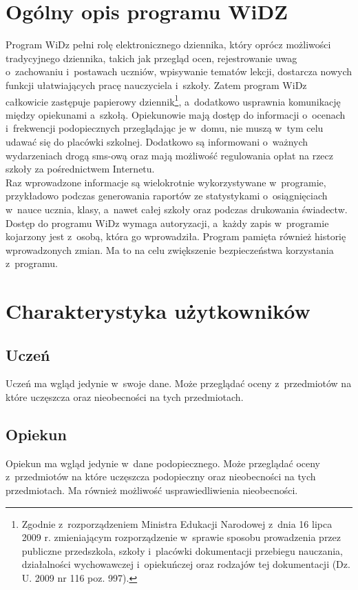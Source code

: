 \documentclass[12pt,leqno,twoside]{mwart}
\begin{document}
\section{Ogólny opis programu WiDZ}
\noindent Program WiDz pełni rolę elektronicznego dziennika, który oprócz możliwości tradycyjnego dziennika, takich jak przegląd ocen, rejestrowanie uwag o~zachowaniu i~postawach uczniów, wpisywanie tematów lekcji, dostarcza nowych funkcji ułatwiających pracę nauczyciela i~szkoły. Zatem program WiDz całkowicie zastępuje papierowy dziennik\footnote{Zgodnie z~rozporządzeniem Ministra Edukacji Narodowej z~dnia 16 lipca 2009 r. zmieniającym rozporządzenie w~sprawie sposobu prowadzenia przez publiczne przedszkola, szkoły i~placówki dokumentacji przebiegu nauczania, działalności wychowawczej i~opiekuńczej oraz rodzajów tej dokumentacji (Dz. U. 2009 nr 116 poz. 997).}, a~dodatkowo usprawnia komunikację między opiekunami a~szkołą. Opiekunowie mają dostęp do informacji o~ocenach i~frekwencji podopiecznych przeglądając je w~domu, nie muszą w~tym celu udawać się do placówki szkolnej. Dodatkowo są informowani o~ważnych wydarzeniach drogą sms-ową oraz mają możliwość regulowania opłat na rzecz szkoły za pośrednictwem Internetu.\\
\indent Raz wprowadzone informacje są wielokrotnie wykorzystywane w~programie, przykładowo podczas generowania raportów ze statystykami o~osiągnięciach w~nauce ucznia, klasy, a~nawet całej szkoły oraz podczas drukowania świadectw.\\
\indent Dostęp do programu WiDz wymaga autoryzacji, a~każdy zapis w~programie  kojarzony jest z~osobą, która go wprowadziła. Program pamięta również historię wprowadzonych zmian. Ma to na celu zwiększenie bezpieczeństwa korzystania z~programu.

\section{Charakterystyka użytkowników}\label{CHARAKTER_UZYTK}
\subsection{Uczeń}
\noindent Uczeń ma wgląd jedynie w~swoje dane. Może przeglądać oceny z~przedmiotów na które uczęszcza oraz nieobecności na tych przedmiotach.

\subsection{Opiekun}
\noindent Opiekun ma wgląd jedynie w~dane podopiecznego. Może przeglądać oceny z~przedmiotów na które uczęszcza podopieczny oraz nieobecności na tych przedmiotach. Ma również możliwość usprawiedliwienia nieobecności.
\end{document}
